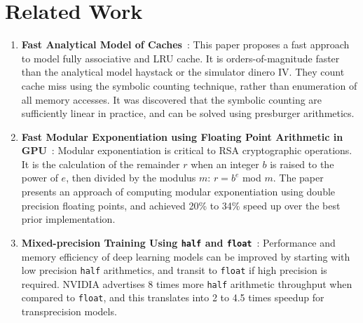 \documentclass[logo,bsc,singlespacing,parskip]{infthesis}
\newcommand{\dthalf}{\texttt{half}}
\newcommand{\dtfloat}{\texttt{float}}
\begin{document}
\chapter{Related Work}
\begin{enumerate}
    
    \item \textbf{Fast Analytical Model of Caches}~\cite{CacheModel}: This paper
    proposes a fast approach to model fully associative and LRU cache. It is
    orders-of-magnitude faster than the analytical model haystack or the
    simulator dinero IV. They count cache miss using the symbolic counting
    technique, rather than enumeration of all memory accesses. It was discovered
    that the symbolic counting are sufficiently linear in practice, and can be
    solved using presburger arithmetics.
    
    \item \textbf{Fast Modular Exponentiation using Floating Point Arithmetic in
    GPU}~\cite{intfpu-modexp}: Modular exponentiation is critical to RSA
    cryptographic operations. It is the calculation of the remainder $r$ when an
    integer $b$ is raised to the power of $e$, then divided by the modulus $m$:
    $r = b ^ e$ mod $m$. The paper presents an approach of computing modular
    exponentiation using double precision floating points, and achieved 20\% to
    34\% speed up over the best prior implementation.
    
    \item \textbf{Mixed-precision Training Using \dthalf{} and
    \dtfloat{}}~\cite{fp16-fast}: Performance and memory efficiency of deep
    learning models can be improved by starting with low precision \dthalf{}
    arithmetics, and transit to \dtfloat{} if high precision is required. NVIDIA
    advertises 8 times more \dthalf{} arithmetic throughput when compared
    to \dtfloat{}, and this translates into 2 to 4.5 times speedup 
    for transprecision models.
\end{enumerate}


\end{document}
